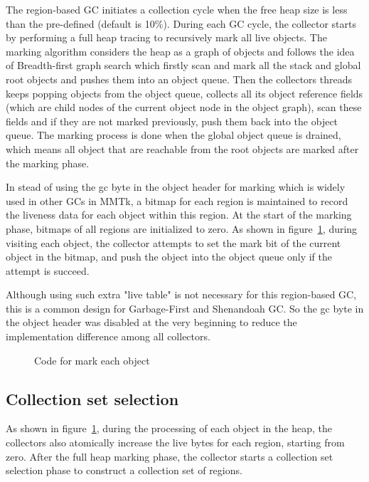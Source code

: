 The region-based GC initiates a collection cycle when the free heap size is less than
the pre-defined  (default is 10\%). During each GC cycle,
the collector starts by performing a full heap tracing to recursively mark all live objects.
The marking algorithm considers the heap as a graph of objects and follows the idea of Breadth-first graph search
which firstly scan and mark all the stack and global root objects and pushes them into an object queue.
Then the collectors threads keeps popping objects from the object queue, collects all its
object reference fields (which are child nodes of the current object node in the object graph), scan these
fields and if they are not marked previously, push them back into the object queue.
The marking process is done when the global object queue is drained, which means all object that are reachable
from the root objects are marked after the marking phase.

In stead of using the gc byte in the object header for marking which is widely used in other GCs in MMTk,
a bitmap for each region is maintained to record the liveness data for each object within this region.
At the start of the marking phase, bitmaps of all regions are initialized to zero.
As shown in figure~\ref{fig:tracemarkobject}, during visiting each object, the collector attempts to set the mark bit
of the current object in the bitmap, and push the object into the object queue only if the attempt is succeed.

Although using such extra "live table" is not necessary for this region-based GC,
this is a common design for Garbage-First and Shenandoah GC.
So the gc byte in the object header was disabled at the very beginning to reduce the implementation difference among all collectors.

\begin{figure}
  \centering
  
  \caption{Code for mark each object}
  \label{fig:tracemarkobject}
\end{figure}

\subsection{Collection set selection}

As shown in figure~\ref{fig:tracemarkobject}, during the processing of each object in the heap,
the collectors also atomically increase the live bytes for each region, starting from zero.
After the full heap marking phase, the collector starts a collection set selection phase to construct
a collection set of regions.

